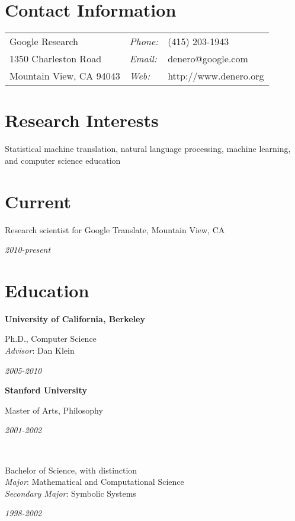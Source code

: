 \documentclass[margin,line]{res}
\newcommand{\dated}[2]{\parbox[t]{4.4in}{#1} \hspace{0.4in}
											 \parbox[t]{1in}{ {\it #2 } } }
\begin{document}

\begin{resume}

\section{\sc Contact Information}
\vspace{.05in}
\begin{tabular}{@{}p{2in}lp{4in}}
Google Research            & {\it Phone:} & (415) 203-1943\\
1350 Charleston Road       & {\it Email:} & denero@google.com\\
Mountain View, CA  94043   & {\it Web:}   & http://www.denero.org\\
\end{tabular}

\section{\sc Research Interests}
\dated{Statistical machine translation, natural language processing, machine
learning, and computer science education}{}

\section{\sc Current}
\dated{Research scientist for Google Translate, Mountain View, CA}
{ 2010-present }

\section{\sc Education}
{\bf University of California, Berkeley} \\
\dated{Ph.D., Computer Science \\
\hspace*{1em} {\it Advisor}: Dan Klein}{ 2005-2010 }

{\bf Stanford University} \\
\dated{Master of Arts, Philosophy\vspace{0.12in}}{ 2001-2002 } \\
\dated{Bachelor of Science, with distinction \\
\hspace*{1em} {\it Major}: Mathematical and Computational Science \\
\hspace*{1em} {\it Secondary Major}: Symbolic Systems}{ 1998-2002 }


\end{resume}
\end{document}
